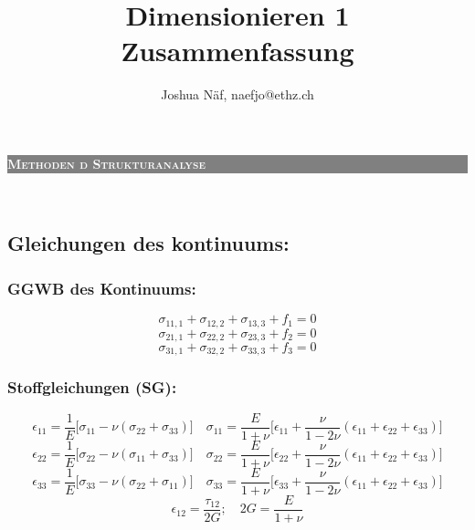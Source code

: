 \documentclass[a4paper,10pt]{article}
\title{Dimensionieren 1 Zusammenfassung\vspace{-2ex}}
\author{Joshua Näf, naefjo@ethz.ch}
\date{}
\begin{document}
\newcommand{\uone}[2]{\colorbox{gray}{\textcolor{white}{\parbox{\linewidth-2.4mm}{\scshape{\normalsize\textbf{#1}} #2}}}\\}

\begin{multicols*}{3}

\uone{Methoden d Strukturanalyse}{}
   \subsection{Gleichungen des kontinuums:}
        \subsubsection{GGWB des Kontinuums:}
        \[\sigma_{11,1} + \sigma_{12,2} + \sigma_{13,3} + f_1 = 0\]
        \[\sigma_{21,1} + \sigma_{22,2} + \sigma_{23,3} + f_2 = 0\]
        \[\sigma_{31,1} + \sigma_{32,2} + \sigma_{33,3} + f_3 = 0\]
        \subsubsection{Stoffgleichungen (SG):}
        \small\[\epsilon_{11} = \frac{1}{E}\lbrack\sigma_{11} - \nu(\sigma_{22} + \sigma_{33})\rbrack \quad \sigma_{11}=\frac{E}{1+\nu}\lbrack\epsilon_{11}+\frac{\nu}{1-2\nu}(\epsilon_{11}+\epsilon_{22}+\epsilon_{33})\rbrack\]
        \[\epsilon_{22} = \frac{1}{E}\lbrack\sigma_{22} - \nu(\sigma_{11} + \sigma_{33})\rbrack \quad \sigma_{22}=\frac{E}{1+\nu}\lbrack\epsilon_{22}+\frac{\nu}{1-2\nu}(\epsilon_{11}+\epsilon_{22}+\epsilon_{33})\rbrack\]
        \[\epsilon_{33} = \frac{1}{E}\lbrack\sigma_{33} - \nu(\sigma_{22} + \sigma_{11})\rbrack \quad \sigma_{33}=\frac{E}{1+\nu}\lbrack\epsilon_{33}+\frac{\nu}{1-2\nu}(\epsilon_{11}+\epsilon_{22}+\epsilon_{33})\rbrack\]\normalsize
        \[\epsilon_{12}=\frac{\tau_{12}}{2G}; \quad 2G=\frac{E}{1+\nu}\]

\end{multicols*}
\end{document}
